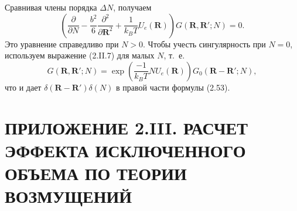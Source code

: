 \documentclass[12pt,a4paper]{article}
\begin{document}
Сравнивая члены порядка $\Delta N$, получаем
\begin{equation}
\left(\frac{\partial}{\partial N} - \frac{b^2}{6}\frac{\partial^2}{\partial\boldsymbol{R}^2} + \frac{1}{k_B T}U_e(\boldsymbol{R})\right)G(\boldsymbol{R}, \boldsymbol{R}'; N) = 0. \tag{2.II.13}
\end{equation}
Это уравнение справедливо при $N > 0$. Чтобы учесть сингулярность при $N = 0$, используем выражение (2.II.7) для малых $N$, т.~е.
\begin{equation}
G(\boldsymbol{R}, \boldsymbol{R}'; N) = \exp\left(\frac{-1}{k_B T}N U_e(\boldsymbol{R})\right)G_0(\boldsymbol{R} - \boldsymbol{R}'; N), \tag{2.II.14}
\end{equation}
что и дает $\delta(\boldsymbol{R} - \boldsymbol{R}')\delta(N)$ в правой части формулы (2.53).

\section*{ПРИЛОЖЕНИЕ 2.III. РАСЧЕТ ЭФФЕКТА ИСКЛЮЧЕННОГО ОБЪЕМА ПО ТЕОРИИ ВОЗМУЩЕНИЙ}
\end{document}
